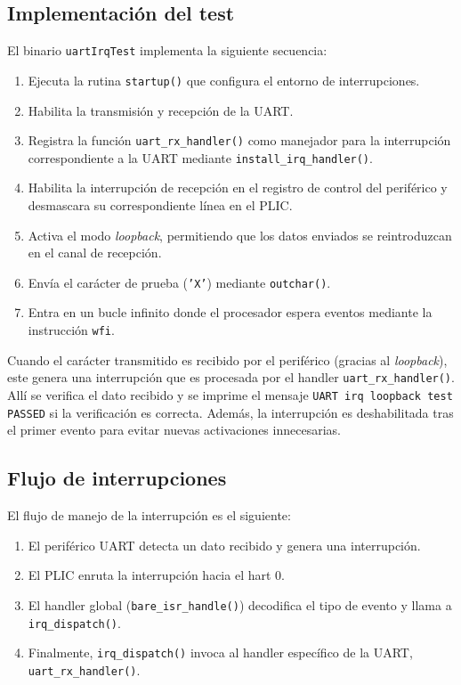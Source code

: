 \subsection*{Implementación del test}

El binario \texttt{uartIrqTest} implementa la siguiente secuencia:

\begin{enumerate}
    \item Ejecuta la rutina \texttt{startup()} que configura el entorno de interrupciones.
    \item Habilita la transmisión y recepción de la UART.
    \item Registra la función \texttt{uart\_rx\_handler()} como manejador para la interrupción correspondiente a la UART mediante \texttt{install\_irq\_handler()}.
    \item Habilita la interrupción de recepción en el registro de control del periférico y desmascara su correspondiente línea en el PLIC.
    \item Activa el modo \emph{loopback}, permitiendo que los datos enviados se reintroduzcan en el canal de recepción.
    \item Envía el carácter de prueba (\texttt{'X'}) mediante \texttt{outchar()}.
    \item Entra en un bucle infinito donde el procesador espera eventos mediante la instrucción \texttt{wfi}.
\end{enumerate}

Cuando el carácter transmitido es recibido por el periférico (gracias al \emph{loopback}), este genera una interrupción que es procesada por el handler \texttt{uart\_rx\_handler()}. Allí se verifica el dato recibido y se imprime el mensaje \texttt{UART irq loopback test PASSED} si la verificación es correcta. Además, la interrupción es deshabilitada tras el primer evento para evitar nuevas activaciones innecesarias.

\subsection*{Flujo de interrupciones}

El flujo de manejo de la interrupción es el siguiente:

\begin{enumerate}
    \item El periférico UART detecta un dato recibido y genera una interrupción.
    \item El PLIC enruta la interrupción hacia el hart 0.
    \item El handler global (\texttt{bare\_isr\_handle()}) decodifica el tipo de evento y llama a \texttt{irq\_dispatch()}.
    \item Finalmente, \texttt{irq\_dispatch()} invoca al handler específico de la UART, \texttt{uart\_rx\_handler()}.
\end{enumerate}

